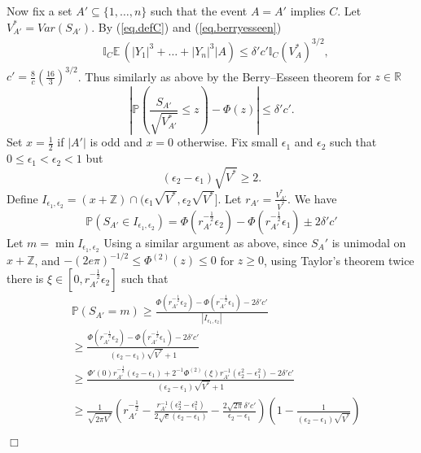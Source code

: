 \documentclass{article}
\newenvironment{proofof}[1]{\noindent {\bf Proof of #1}}{\hspace*{\fill}$\Box$}
\def\E{{\mathbb E}\,}
\newcommand{\pr}{\mathbb P}
\begin{document}
\begin{proofof}{Lemma~\ref{lem.clt}}
    Now fix a set $A' \subseteq \{1, \dots, n\}$ such that the event $A=A'$ implies $C$.
    Let $V_{A'}^* = Var(S_{A'})$. By (\ref{eq.defC}) and (\ref{eq.berryesseen})
    \begin{align*}
        &\mathbb{I}_C\E(|Y_1|^3 + \dots + |Y_n|^3 | A)
\le \delta' c' \mathbb{I}_C (V_{A}^*)^{3/2},
    \end{align*}
    $c'  = \frac 8 c (\frac {16} 3)^{3/2}$.
    Thus similarly as above by the Berry--Esseen theorem for $z\in \mathbb{R}$
    \[
       \left |\pr\left(\frac{S_{A'}}{\sqrt{V_{A'}^*}} \le z\right) - \Phi(z) \right| \le \delta'c'. 
    \]
    Set $x = \frac 1 2$ if $|A'|$ is odd and $x=0$ otherwise.
    Fix small $\epsilon_1$ and $\epsilon_2$ such that $0 \le \epsilon_1 < \epsilon_2 < 1$
    but 
    \begin{equation}\label{eq.eps2eps1}
        {(\epsilon_2 - \epsilon_1) \sqrt{V^*}} \ge 2. \end{equation}
    Define $I_{\epsilon_1, \epsilon_2} = (x + \mathbb{Z}) \cap (\epsilon_1 \sqrt{V^*}, \epsilon_2 \sqrt{V^*}]$.
Let $r_{A'} = \frac {V_{A'}^*} {V^*}$.
We have
    \[
        \pr(S_{A'} \in I_{\epsilon_1, \epsilon_2}) = \Phi(r_{A'}^{-\frac 1 2} \epsilon_2) - \Phi(r_{A'}^{-\frac 1 2} \epsilon_1) \pm 2 \delta'c'
    \]
    Let $m=\min I_{\epsilon_1, \epsilon_2}$
    Using a similar argument as above, since $S_A'$ is unimodal on $x + \mathbb{Z}$, and $-(2e \pi)^{-1/2} \le \Phi^{(2)}(z) \le 0$ for $z \ge 0$,
using Taylor's theorem twice
    there is $\xi \in [0, r_{A'}^{-\frac 1 2}\epsilon_2]$ such that
    \begin{align*}
        &\pr(S_{A'} = m) \ge \frac {\Phi(r_{A'}^{-\frac 1 2} \epsilon_2) - \Phi( r_{A'}^{-\frac 1 2} \epsilon_1) - 2 \delta'c'} {|I_{\epsilon_1, \epsilon_2}|} \nonumber
        \\ & \ge \frac {\Phi( r_{A'}^{-\frac 1 2} \epsilon_2) - \Phi( r_{A'}^{-\frac 1 2}  \epsilon_1) - 2 \delta'c'} {(\epsilon_2 - \epsilon_1) \sqrt{V^*} + 1} \nonumber
        \\ & \ge  \frac {\Phi'(0)r_{A'}^{-\frac 1 2}(\epsilon_2 - \epsilon_1) + 2^{-1}\Phi^{(2)}(\xi) r_{A'}^{-1} (\epsilon_2^2 - \epsilon_1^2) - 2 \delta'c'} {(\epsilon_2 - \epsilon_1) \sqrt{V^*} + 1} \nonumber
        \\ & \ge \frac 1 {\sqrt {2 \pi V^*}} (r_{A'}^{-\frac 1 2} - \frac{r_{A'}^{-1} (\epsilon_2^2 - \epsilon_1^2)} {2 \sqrt e (\epsilon_2-\epsilon_1)}  - \frac {2 \sqrt{2 \pi} \delta'c'} {\epsilon_2 - \epsilon_1}) (1 - \frac 1 {(\epsilon_2 - \epsilon_1) \sqrt{V^*}}) \nonumber
    \end{align*}

\end{proofof}
\end{document}
